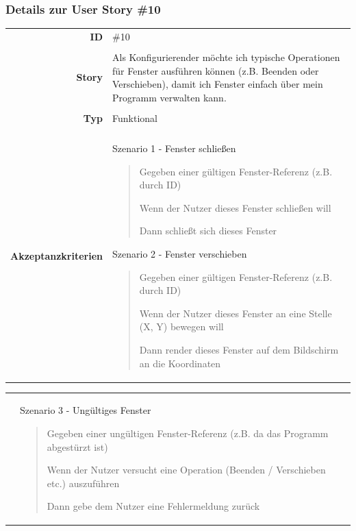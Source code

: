 \documentclass{article}
\begin{document}
\subsubsection{Details zur User Story \#10}

\begin{tabularx}{\textwidth}{r X}
	\textbf{ID}                 & \#10                                                                                                                                                                            \\
	\\
	\textbf{Story}              & Als Konfigurierender möchte ich typische Operationen für Fenster ausführen können (z.B. Beenden oder Verschieben), damit ich Fenster einfach über mein Programm verwalten kann. \\
	\\
	\textbf{Typ}                & Funktional                                                                                                                                                                      \\
	\\
	\textbf{Akzeptanzkriterien} & Szenario 1 - Fenster schließen
	\begin{quote}
		Gegeben einer gültigen Fenster-Referenz (z.B. durch ID)

		Wenn der Nutzer dieses Fenster schließen will

		Dann schließt sich dieses Fenster
	\end{quote}
	Szenario 2 - Fenster verschieben
	\begin{quote}
		Gegeben einer gültigen Fenster-Referenz (z.B. durch ID)

		Wenn der Nutzer dieses Fenster an eine Stelle (X, Y) bewegen will

		Dann render dieses Fenster auf dem Bildschirm an die Koordinaten
	\end{quote}
\end{tabularx}

\begin{tabularx}{\textwidth}{r X}
	\hspace*{7.75em} & Szenario 3 - Ungültiges Fenster
	\begin{quote}
		Gegeben einer ungültigen Fenster-Referenz (z.B. da das Programm abgestürzt ist)

		Wenn der Nutzer versucht eine Operation (Beenden / Verschieben etc.) auszuführen

		Dann gebe dem Nutzer eine Fehlermeldung zurück
	\end{quote}
\end{tabularx}
\end{document}
